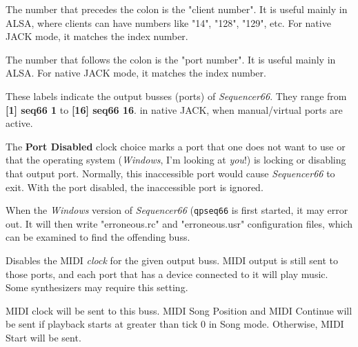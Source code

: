    The number that precedes the colon is the "client number".
   It is useful mainly in ALSA, where clients can have numbers like "14",
   "128", "129", etc.  For native JACK mode, it matches the index number.

   The number that follows the colon is the "port number".
   It is useful mainly in ALSA.
   For native JACK mode, it matches the index number.

   These labels indicate the output busses (ports) of \textsl{Sequencer66}.
   They range from \textbf{[1] seq66 1} to \textbf{[16] seq66 16}.
   in native JACK, when manual/virtual ports are active.

   The \textbf{Port Disabled} clock choice marks a port
   that one does not want to use or that the operating system
   (\textsl{Windows}, I'm looking at \textsl{you}!)
   is locking or disabling that output port.
   Normally, this inaccessible port would cause \textsl{Sequencer66} to exit.
   With the port disabled, the inaccessible port is ignored.

   When the \textsl{Windows} version of \textsl{Sequencer66}
   (\texttt{qpseq66} is first started, it may error out.
   It will then write "erroneous.rc" and "erroneous.usr" configuration
   files, which can be examined to find the offending buss.

   Disables the MIDI \textsl{clock} for the given output buss.
   MIDI output is still sent to those ports, and
   each port that has a device connected to it will play music.
   Some synthesizers may require this setting.

   MIDI clock will be sent to this buss.
   MIDI Song Position and MIDI Continue will be sent if playback starts
   at greater than tick 0 in Song mode.  Otherwise, MIDI Start will be sent.

